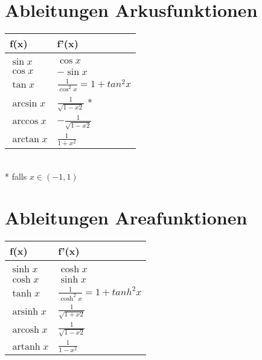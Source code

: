 \documentclass[../main.tex]{subfiles}
\begin{document}
\section{Ableitungen Arkusfunktionen}
\begin{tabularx}{0.8\textwidth} { 
    >{\centering\arraybackslash}X 
    >{\centering\arraybackslash}X  }
    \hline
    f(x) & f'(x) \\ [7pt]
    \hline \\
    $\sin x$ & $\cos x$
    \\ [7pt]
    $\cos x$ & $-\sin x$
    \\ [7pt]
    $\tan x$ & $\frac{1}{\cos ^2x} = 1 + tan ^2 x$
    \\ [7pt]
    $\arcsin x$ & $\frac{1}{\sqrt{1 - x2}}$ * 
    \\ [7pt]
    $\arccos x$ & $-\frac{1}{\sqrt{1 - x2}}$
    \\ [7pt]
    $\arctan x$ & $\frac{1}{1 + x^2}$ 
\end{tabularx} \\ [7pt]
* falls $x \in (-1,1)$

\section{Ableitungen Areafunktionen}
\begin{tabularx}{0.8\textwidth} { 
    >{\centering\arraybackslash}X 
    >{\centering\arraybackslash}X  }
    \hline
    f(x) & f'(x) \\ [7pt]
    \hline \\
    $\sinh x$ & $\cosh x$
    \\ [7pt]
    $\cosh x$ & $\sinh x$
    \\ [7pt]
    $\tanh x$ & $\frac{1}{\cosh ^2x} = 1 + tanh ^2 x$
    \\ [7pt]
    $\operatorname{arsinh} x$ & $\frac{1}{\sqrt{1 + x2}}$
    \\ [7pt]
    $\operatorname{arcosh} x$ & $\frac{1}{\sqrt{1 - x2}}$
    \\ [7pt]
    $\operatorname{artanh} x$ & $\frac{1}{1 - x^2}$ 
\end{tabularx}
\end{document}
